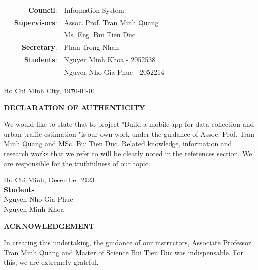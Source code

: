 \documentclass[a4paper]{article}
\begin{document}
\begin{titlepage}
\begin{center}
\begin{table}[h]
    \large
    \begin{tabular}{r r l}
    \hspace{4 cm} & \textbf{Council}: & Information System \\
    & \textbf{Supervisors}: & Assoc. Prof. Tran Minh Quang \\ 
    & & Ms. Eng. Bui Tien Duc\\
    & \textbf{Secretary}: & Phan Trong Nhan \\
    & \textbf{Students}: & Nguyen Minh Khoa - 2052538\\
    & & Nguyen Nho Gia Phuc - 2052214 \\
    \end{tabular}
\end{table}
\vspace{2cm}

{Ho Chi Minh City, \today}
\end{center}
\end{titlepage}

\begin{center}
    \Large{\textbf{DECLARATION OF AUTHENTICITY}}
\end{center}
We would like to state that to project "Build a mobile app for data collection and urban traffic estimation "is our own work under the guidance of Assoc. Prof. Tran Minh Quang and MSc. Bui Tien Duc. Related knowledge, information and research works that we refer to will be clearly noted in the references section.
We are responsible for the truthfulness of our topic.

\begin{flushright}
    Ho Chi Minh, December 2023 \\
    \textbf{Students} \\
    Nguyen Nho Gia Phuc \\
    Nguyen Minh Khoa
\end{flushright}


\newpage
\begin{center}
    \Large{\textbf{ACKNOWLEDGEMENT}}
\end{center}

In creating this undertaking, the guidance of our instructors, Associate Professor Tran Minh Quang and Master of Science Bui Tien Duc was indispensable. For this, we are extremely grateful. 
\end{document}
